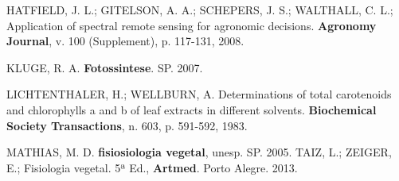 \documentclass[article,12pt,onesidea,4paper,english,brazil]{abntex2}
\begin{document}
\noindent HATFIELD, J. L.; GITELSON, A. A.; SCHEPERS, J. S.; WALTHALL, C. L.; 
Application of spectral remote sensing for agronomic decisions. \textbf {Agronomy Journal}, v. 100 (Supplement), p. 117-131, 2008. 

\noindent KLUGE, R. A. \textbf {Fotossintese}. SP. 2007. 

\noindent LICHTENTHALER, H.; WELLBURN, A. Determinations of total carotenoids and chlorophylls a and b of leaf extracts in different solvents. \textbf {Biochemical Society Transactions}, n. 603, p. 591-592, 1983. 

\noindent MATHIAS, M. D. \textbf {fisiosiologia vegetal}, unesp. SP. 2005. 
\noindent TAIZ, L.; ZEIGER, E.; Fisiologia vegetal. 5ª Ed., \textbf {Artmed}. Porto Alegre. 2013.

	
\end{document}
